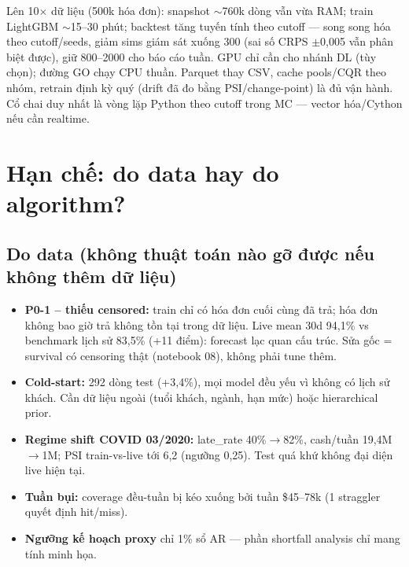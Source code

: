 \documentclass[12pt,a4paper]{article}
\begin{document}
Lên 10$\times$ dữ liệu (500k hóa đơn): snapshot $\sim$760k dòng vẫn vừa RAM;
train LightGBM $\sim$15--30 phút; backtest tăng tuyến tính theo cutoff --- song song hóa theo
cutoff/seeds, giảm sims giám sát xuống 300 (sai số CRPS $\pm$0,005 vẫn phân biệt được),
giữ 800--2000 cho báo cáo tuần. GPU chỉ cần cho nhánh DL (tùy chọn); đường GO chạy CPU thuần.
Parquet thay CSV, cache pools/CQR theo nhóm, retrain định kỳ quý (drift đã đo bằng PSI/change-point)
là đủ vận hành. Cổ chai duy nhất là vòng lặp Python theo cutoff trong MC --- vector hóa/Cython
nếu cần realtime.

\section{Hạn chế: do data hay do algorithm?}
\label{sec:limits}

\subsection{Do data (không thuật toán nào gỡ được nếu không thêm dữ liệu)}
\begin{itemize}
\item \textbf{P0-1 -- thiếu censored:} train chỉ có hóa đơn cuối cùng đã trả; hóa đơn không bao giờ
trả không tồn tại trong dữ liệu. Live mean 30d 94,1\% vs benchmark lịch sử 83,5\% (+11 điểm):
forecast lạc quan cấu trúc. Sửa gốc = survival có censoring thật (notebook 08), không phải tune thêm.
\item \textbf{Cold-start:} 292 dòng test (+3,4\%), mọi model đều yếu vì không có lịch sử khách.
Cần dữ liệu ngoài (tuổi khách, ngành, hạn mức) hoặc hierarchical prior.
\item \textbf{Regime shift COVID 03/2020:} late\_rate 40\%$\to$82\%, cash/tuần 19,4M$\to$1M;
PSI train-vs-live tới 6,2 (ngưỡng 0,25). Test quá khứ không đại diện live hiện tại.
\item \textbf{Tuần bụi:} coverage đều-tuần bị kéo xuống bởi tuần \$45--78k (1 straggler quyết định hit/miss).
\item \textbf{Ngưỡng kế hoạch proxy} chỉ 1\% sổ AR --- phần shortfall analysis chỉ mang tính minh họa.
\end{itemize}
\end{document}

